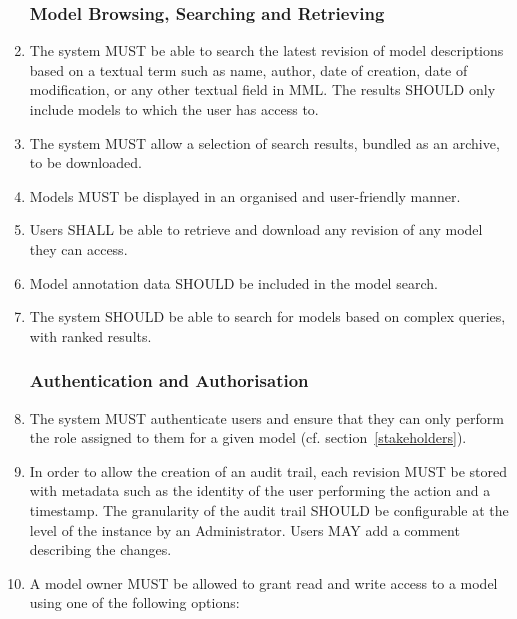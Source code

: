\begin{enumerate}[1]
\subsubsection{Model Browsing, Searching and Retrieving}
\item The system MUST be able to search the latest revision of model descriptions based on a textual term such as name, author, date of creation, date of modification, or any other textual field in MML. The results SHOULD only include models to which the user has access to.

\item The system MUST allow a selection of search results, bundled as an archive, to be downloaded.

\item Models MUST be displayed in an organised and user-friendly manner.

\item Users SHALL be able to retrieve and download any revision of any model they can access.

\item Model annotation data SHOULD be included in the model search.

\item The system SHOULD be able to search for models based on complex queries, with ranked results.

\subsubsection{Authentication and Authorisation}
\item The system MUST authenticate users and ensure that they can only perform the role assigned to them for a given model (cf. section~\ref{stakeholders}).

\item In order to allow the creation of an audit trail, each revision MUST be stored with metadata such as the identity of the user performing the action and a timestamp. The granularity of the audit trail SHOULD be configurable at the level of the instance by an Administrator. Users MAY add a comment describing the changes.

\item A model owner MUST be allowed to grant read and write access to a model using one of the following options:


\end{enumerate}
